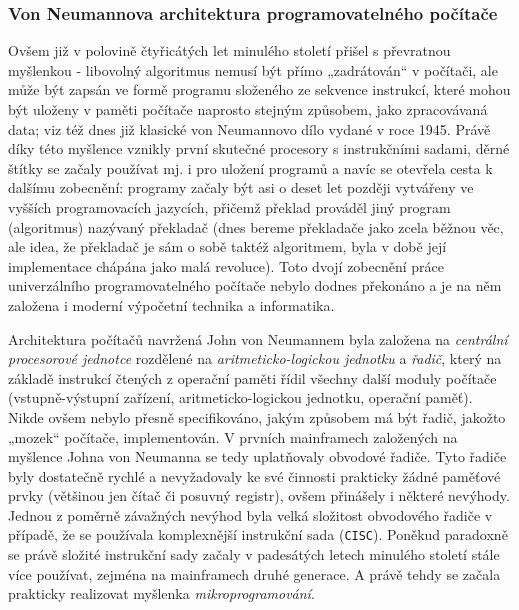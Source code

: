       \subsubsection{Von Neumannova architektura programovatelného počítače}
        Ovšem již v polovině čtyřicátých let minulého století přišel \wikiNeumann s převratnou 
        myšlenkou - libovolný algoritmus nemusí být přímo „zadrátován“ v počítači, ale může být 
        zapsán ve formě programu složeného ze sekvence instrukcí, které mohou být uloženy v paměti 
        počítače naprosto stejným způsobem, jako zpracovávaná data; viz též dnes již klasické von 
        Neumannovo dílo \wikiEDVAC vydané v roce 1945. Právě díky této myšlence vznikly první 
        skutečné procesory s instrukčními sadami, děrné štítky se začaly používat mj. i pro uložení 
        programů a navíc se otevřela cesta k dalšímu zobecnění: programy začaly být asi o deset let 
        později vytvářeny ve vyšších programovacích jazycích, přičemž překlad prováděl jiný program 
        (algoritmus) nazývaný překladač (dnes bereme překladače jako zcela běžnou věc, ale idea, že 
        překladač je sám o sobě taktéž algoritmem, byla v době její implementace chápána jako malá 
        revoluce). Toto dvojí zobecnění práce univerzálního programovatelného počítače nebylo 
        dodnes překonáno a je na něm založena i moderní výpočetní technika a informatika.
        
        Architektura počítačů navržená John von Neumannem byla založena na \emph{centrální 
        procesorové jednotce} rozdělené na \emph{aritme\-ticko-logickou jednotku} a 
        \emph{řadič}, 
        který na základě instrukcí čtených z operační paměti řídil všechny další moduly počítače 
        (vstupně-výstupní zařízení, aritmeticko-logickou jednotku, operační paměť). Nikde ovšem 
        nebylo přesně specifikováno, jakým způsobem má být řadič, jakožto „mozek“ počítače, 
        implementován. V prvních mainframech založených na myšlence Johna von Neumanna se tedy 
        uplatňovaly obvodové řadiče. Tyto řadiče byly dostatečně rychlé a nevyžadovaly ke své 
        činnosti prakticky žádné paměťové prvky (většinou jen čítač či posuvný registr), ovšem 
        přinášely i některé nevýhody. Jednou z poměrně závažných nevýhod byla velká složitost 
        obvodového řadiče v případě, že se používala komplexnější instrukční sada (\texttt{CISC}). 
        Poněkud paradoxně se právě složité instrukční sady začaly v padesátých letech minulého 
        století stále více používat, zejména na mainframech druhé generace. A právě tehdy se začala 
        prakticky realizovat myšlenka \emph{mikroprogramování}.
      
